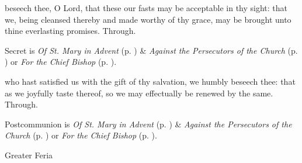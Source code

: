 \secret
{} beseech thee, O Lord, that these our fasts may be acceptable in thy sight: that we, being cleansed thereby and made worthy of thy grace, may be brought unto thine everlasting promises. Through.
\begin{rubric}
     Secret is \emph{Of St. Mary in Advent} (p. \pageref{SPMaryInAdvent}) \&  \emph{Against the Persecutors of the Church} (p. \pageref{SPAgainst}) or \emph{For the Chief Bishop} (p. \pageref{SPChiefBishop}).
\end{rubric}


\clearpage

\postcommunion
{} who hast satisfied us with the gift of thy salvation, we humbly beseech thee: that as we joyfully taste thereof, so we may effectually be renewed by the same. Through.
\begin{rubric}
     Postcommunion is \emph{Of St. Mary in Advent} (p. \pageref{SPMaryInAdvent}) \&  \emph{Against the Persecutors of the Church} (p. \pageref{SPAgainst}) or \emph{For the Chief Bishop} (p. \pageref{SPChiefBishop}).
\end{rubric}

\begin{inhead}
{Greater Feria}
\end{inhead}

\properantiphonfix

